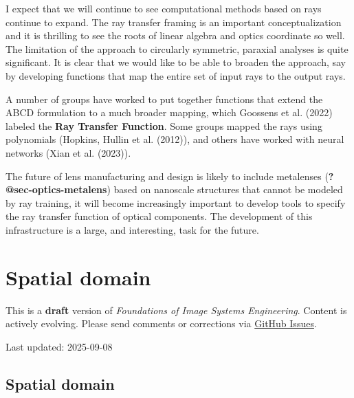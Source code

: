 \documentclass[
  letterpaper,
]{book}
\begin{document}
I expect that we will continue to see computational methods based on
rays continue to expand. The ray transfer framing is an important
conceptualization and it is thrilling to see the roots of linear algebra
and optics coordinate so well. The limitation of the approach to
circularly symmetric, paraxial analyses is quite significant. It is
clear that we would like to be able to broaden the approach, say by
developing functions that map the entire set of input rays to the output
rays.

A number of groups have worked to put together functions that extend the
ABCD formulation to a much broader mapping, which Goossens et al. (2022)
labeled the \textbf{Ray Transfer Function}. Some groups mapped the rays
using polynomials (Hopkins, Hullin et al. (2012)), and others have
worked with neural networks (Xian et al. (2023)).

The future of lens manufacturing and design is likely to include
metalenses (\textbf{?@sec-optics-metalens}) based on nanoscale
structures that cannot be modeled by ray training, it will become
increasingly important to develop tools to specify the ray transfer
function of optical components. The development of this infrastructure
is a large, and interesting, task for the future.

\chapter{Spatial domain}\label{sec-optics-linear-space}

\begin{tcolorbox}[enhanced jigsaw, opacityback=0, breakable, coltitle=black, leftrule=.75mm, left=2mm, colframe=quarto-callout-warning-color-frame, opacitybacktitle=0.6, bottomtitle=1mm, bottomrule=.15mm, toprule=.15mm, title=\textcolor{quarto-callout-warning-color}{\faExclamationTriangle}\hspace{0.5em}{Work in Progress}, titlerule=0mm, toptitle=1mm, colback=white, rightrule=.15mm, colbacktitle=quarto-callout-warning-color!10!white, arc=.35mm]

This is a \textbf{draft} version of \emph{Foundations of Image Systems
Engineering}. Content is actively evolving. Please send comments or
corrections via \href{https://github.com/wandell/FISE-git/issues}{GitHub
Issues}.

Last updated: 2025-09-08

\end{tcolorbox}

\section{Spatial domain}\label{sec-optics-linear-space-overview}
\end{document}
